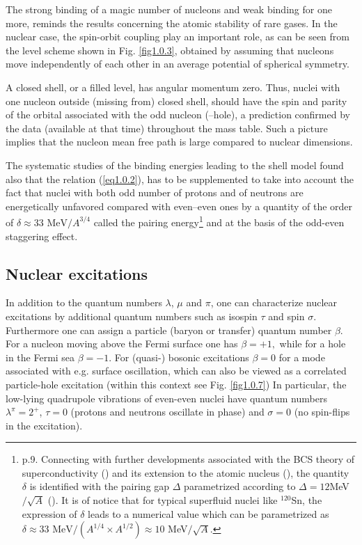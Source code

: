 The strong binding of a magic number of nucleons and weak binding for one more, reminds the results  concerning the atomic stability of rare gases. In the nuclear case,  the spin-orbit coupling play an important role, as can be seen from the level scheme shown in Fig. \ref{fig1.0.3}, obtained by assuming that nucleons move independently of each other in an average potential  of  spherical symmetry.


A closed shell, or a filled level, has angular momentum zero. Thus, nuclei with one nucleon outside (missing from) closed shell, should have the spin and parity of the orbital associated with the odd nucleon (--hole), a prediction confirmed by the data (available at that time) throughout the mass table. Such a picture implies that the nucleon mean free path is large compared to nuclear dimensions.


The systematic studies of the binding energies leading to the shell model found also that the relation (\ref{eq1.0.2}), has to be supplemented to take into account the fact that nuclei with both odd number of protons and of neutrons are energetically unfavored compared with even--even ones by a quantity of the order of $\delta\approx33\text{ MeV}/A^{3/4}$ called the pairing energy\footnote{\label{foot2} \cite{Mayer:55} p.9. Connecting with further developments associated with the BCS theory of superconductivity (\cite{Bardeen:57a,Bardeen:57b}) and its extension to the atomic nucleus (\cite{Bohr:58}), the quantity $\delta$ is identified with the pairing gap $\Delta$ parametrized according to $\Delta=12 $MeV$/\sqrt{A}$ (\cite{Bohr:69}). It is of notice that for typical superfluid nuclei like $^{120}$Sn, the expression of $\delta$ leads to a numerical value which can be parametrized as  $\delta\approx33\text{ MeV}/(A^{1/4}\times A^{1/2})\approx10$ MeV$/\sqrt{A}$.} and at the basis of the odd-even staggering effect.

\subsection{Nuclear excitations}\label{S1.1.2}
In addition to the quantum numbers $\lambda$,  $\mu$ and $\pi$, one can characterize nuclear excitations by additional quantum numbers such as isospin $\tau$ and spin $\sigma$. Furthermore one can assign a particle (baryon or transfer) quantum number $\beta$. For a nucleon moving above the Fermi surface one has $\beta=+1,$ while for a hole in the Fermi sea $\beta=-1$. For (quasi-) bosonic excitations $\beta=0$ for a mode associated with e.g. surface oscillation, which can also be viewed as a correlated particle-hole excitation (within this context see Fig. \ref{fig1.0.7}) In particular, the low-lying quadrupole vibrations of even-even nuclei have quantum numbers $\lambda^\pi=2^+$, $\tau=0$ (protons and neutrons oscillate in phase) and $\sigma=0$ (no spin-flips in the excitation).


